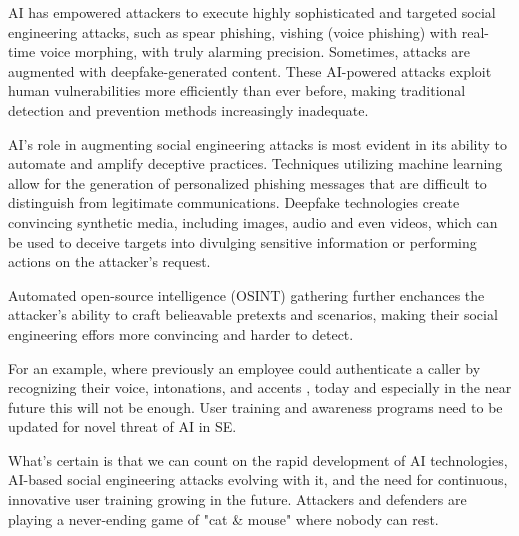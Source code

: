 AI has empowered attackers to execute highly sophisticated and targeted social engineering attacks, such as spear phishing, vishing (voice phishing) with real-time voice morphing, with truly alarming precision. Sometimes, attacks are augmented with deepfake-generated content. These AI-powered attacks exploit human vulnerabilities more efficiently than ever before, making traditional detection and prevention methods increasingly inadequate.

AI's role in augmenting social engineering attacks is most evident in its ability to automate and amplify deceptive practices. Techniques utilizing machine learning allow for the generation of personalized phishing messages that are difficult to distinguish from legitimate communications. Deepfake technologies create convincing synthetic media, including images, audio and even videos, which can be used to deceive targets into divulging sensitive information or performing actions on the attacker's request.


Automated open-source intelligence (OSINT) gathering further enchances the attacker's ability to craft belieavable pretexts and scenarios, making their social engineering effors more convincing and harder to detect.

For an example, where previously an employee could authenticate a caller by recognizing their voice, intonations, and accents \citep{mitnickArtDeceptionControlling2003}, today and especially in the near future this will not be enough. User training and awareness programs need to be updated for novel threat of AI in SE.


What's certain is that we can count on the rapid development of AI technologies, AI-based social engineering attacks evolving with it, and the need for continuous, innovative user training growing in the future. Attackers and defenders are playing a never-ending game of "cat \& mouse" where nobody can rest.

